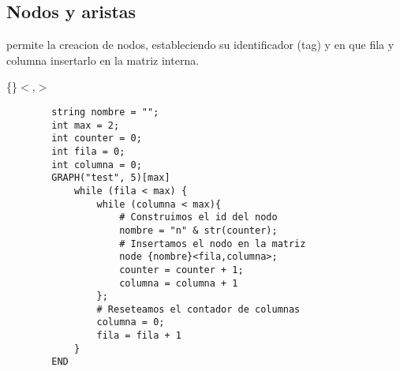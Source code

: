 \documentclass{article}
\begin{document}
    \subsection{Nodos y aristas}
     permite la creacion de nodos, estableciendo su identificador (tag) y en que fila y columna insertarlo 
    en la matriz interna.
    \begin{center}
        \{\}$<$,$>$
    \end{center}
    \begin{lstlisting}
        string nombre = "";
        int max = 2;
        int counter = 0;
        int fila = 0;
        int columna = 0;
        GRAPH("test", 5)[max]
            while (fila < max) {
                while (columna < max){
                    # Construimos el id del nodo
                    nombre = "n" & str(counter);
                    # Insertamos el nodo en la matriz
                    node {nombre}<fila,columna>;
                    counter = counter + 1;
                    columna = columna + 1
                };
                # Reseteamos el contador de columnas
                columna = 0;
                fila = fila + 1
            }
        END
    \end{lstlisting}
\end{document}

